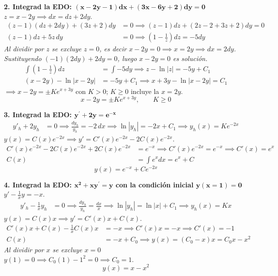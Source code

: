 \documentclass[11pt, a4paper]{article}
\begin{document}
\noindent\textbf{2. Integrad la EDO: $\bm{(x-2y-1)dx+(3x-6y+2)dy=0}$} \\
$z = x-2y \implies dx = dz + 2dy$.
\begin{align*}
(z-1)(dz + 2dy) + (3z+2)dy &= 0 \implies (z-1)dz + (2z-2+3z+2)dy = 0 \\
(z-1)dz + 5z\,dy &= 0 \implies \left(1 - \frac{1}{z}\right)dz = -5dy
\end{align*}
\textit{Al dividir por $z$ se excluye $z=0$, es decir $x-2y=0 \implies x=2y \implies dx=2dy$. Sustituyendo $(-1)(2dy) + 2dy = 0$, luego $x-2y=0$ es solución.}
\begin{align*}
\int \left(1 - \frac{1}{z}\right)dz &= \int -5dy \implies z - \ln|z| = -5y + C_1 \\
(x-2y) - \ln|x-2y| &= -5y + C_1 \implies x + 3y - \ln|x-2y| = C_1
\end{align*}
$\implies x-2y = \pm K e^{x+3y}$ con $K>0$; $K\geq 0$ incluye la $x=2y$.
\[
\boxed{x - 2y = \pm K e^{x+3y}, \qquad K \geq 0}
\]


\noindent\textbf{3. Integrad la EDO: $\bm{y^{\prime}+2y=e^{-x}}$} \\
\begin{align*}
y'_h + 2y_h &= 0 \implies \frac{dy_h}{y_h} = -2\,dx \implies \ln|y_h| = -2x + C_1 \implies y_h(x) = K e^{-2x}
\end{align*}
$y(x) = C(x) e^{-2x} \implies y' = C'(x) e^{-2x} - 2C(x) e^{-2x}$. \\
\begin{align*}
C'(x) e^{-2x} - 2C(x) e^{-2x} + 2C(x) e^{-2x} &= e^{-x} \implies C'(x) e^{-2x} = e^{-x} \implies C'(x) = e^x \\
C(x) &= \int e^x dx = e^x + C
\end{align*}
\[
\boxed{y(x) = e^{-x} + C e^{-2x}}
\]


\noindent\textbf{4. Integrad la EDO: $\bm{x^{2}+xy^{\prime}=y}$ con la condición inicial $\bm{y(x=1)=0}$} \\
$y' - \frac{1}{x}y = -x$. \\
\begin{align*}
y'_h - \frac{1}{x}y_h &= 0 \implies \frac{dy_h}{y_h} = \frac{dx}{x} \implies \ln|y_h| = \ln|x| + C_1 \implies y_h(x) = Kx
\end{align*}
$y(x) = C(x)x \implies y' = C'(x)x + C(x)$. \\
\begin{align*}
C'(x)x + C(x) - \frac{1}{x}C(x)x &= -x \implies C'(x)x = -x \implies C'(x) = -1 \\
C(x) &= -x + C_0 \implies y(x) = (C_0 - x)x = C_0 x - x^2
\end{align*}
\textit{Al dividir por $x$ se excluye $x=0$} \\
$y(1)=0 \implies C_0(1) - 1^2 = 0 \implies C_0 = 1$.
\[
\boxed{y(x) = x - x^2}
\]
\end{document}
